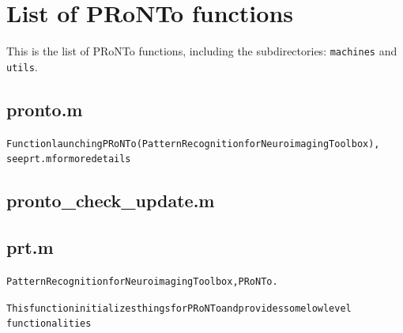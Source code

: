 \chapter{List of PRoNTo functions  \label{Chap:sec:functions}}
\minitoc

\vskip 1.5cm

This is the list of PRoNTo functions, including the subdirectories: {\tt machines} and {\tt utils}.


\section{pronto.m}
\begin{alltt}

 Function launching PRoNTo (Pattern Recognition for Neuroimaging Toolbox),
 see prt.m for more details
 
\end{alltt}


\section{pronto\_check\_update.m}
\begin{alltt}

\end{alltt}


\section{prt.m}
\begin{alltt}

 Pattern Recognition for Neuroimaging Toolbox, PRoNTo.
 
 This function initializes things for PRoNTo and provides some low level
 functionalities
 
\end{alltt}


